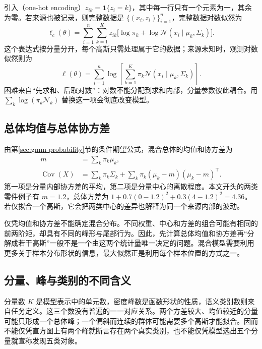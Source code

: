 \documentclass[UTF8]{ctexart}
\begin{document}
引入（one-hot encoding）$z_{ik}=\mathbf1\{z_i=k\}$，其中每一行只有一个元素为一，其余为零。若来源也被记录，则完整数据是 $\{(x_i,z_i)\}_{i=1}^n$，完整数据对数似然为
\begin{equation}
\ell_c(\theta)=\sum_{i=1}^n\sum_{k=1}^Kz_{ik}
\bigl[\log\pi_k+\log\mathcal N(x_i\mid\mu_k,\Sigma_k)\bigr].
\label{eq:gmm-complete-loglik}
\end{equation}
这个表达式按分量分开，每个高斯只需处理属于它的数据；来源未知时，观测对数似然则为
\begin{equation}
\ell(\theta)=\sum_{i=1}^n\log\!\left[\sum_{k=1}^K\pi_k\mathcal N(x_i\mid\mu_k,\Sigma_k)\right].
\label{eq:gmm-observed-loglik}
\end{equation}
困难来自“先求和、后取对数”：对数不能分配到求和内部，分量参数彼此耦合。用 $\sum_k\log(\pi_k\mathcal N_k)$ 替换这一项会彻底改变模型。

\subsection{总体均值与总体协方差}
由第\ref{sec:gmm-probability}节的条件期望公式，混合总体的均值和协方差为
\begin{align}
m&=\sum_k\pi_k\mu_k,\label{eq:gmm-mixture-mean}\\
\operatorname{Cov}(X)&=\sum_k\pi_k\Sigma_k
+\sum_k\pi_k(\mu_k-m)(\mu_k-m)^\top.\label{eq:gmm-mixture-cov}
\end{align}
第一项是分量内部协方差的平均，第二项是分量中心的离散程度。本文开头的两类零件例子有 $m=1.2$，总体方差为 $1+0.7(0-1.2)^2+0.3(4-1.2)^2=4.36$。若仅拟合一个高斯，它会把两类中心的差异也解释为同一个来源内部的波动。

仅凭均值和协方差不能确定混合分布。不同权重、中心和方差的组合可能有相同的前两阶矩，却具有不同的峰形与尾部行为。因此，先计算总体均值和协方差再“分解成若干高斯”一般不是一个由这两个统计量唯一决定的问题。混合模型需要利用更多关于样本分布形状的信息，最大似然正是利用每个样本位置的方式之一。

\subsection{分量、峰与类别的不同含义}
分量数 $K$ 是模型表示中的单元数，密度峰数是函数形状的性质，语义类别数则来自任务定义。这三个数没有普遍的一一对应关系。两个方差较大、均值较近的分量可能只形成一个总体峰；一个偏斜而连续的群体可能需要多个高斯才能拟合。因而不能仅凭直方图上有两个峰就断言存在两个真实类别，也不能仅凭模型选出五个分量就宣称发现五类对象。
\end{document}
